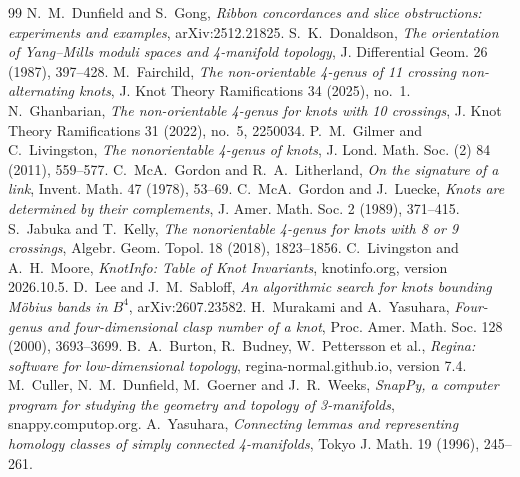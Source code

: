 \documentclass[11pt]{amsart}
\theoremstyle{definition}
\theoremstyle{remark}
\begin{document}
\begin{thebibliography}{99}
 N.~M.~Dunfield and S.~Gong, \emph{Ribbon concordances and slice obstructions:
experiments and examples}, arXiv:2512.21825.
 S.~K.~Donaldson, \emph{The orientation of Yang--Mills moduli spaces and
4-manifold topology}, J. Differential Geom. 26 (1987), 397--428.
 M.~Fairchild, \emph{The non-orientable 4-genus of 11 crossing non-alternating
knots}, J. Knot Theory Ramifications 34 (2025), no.~1.
 N.~Ghanbarian, \emph{The non-orientable 4-genus for knots with 10 crossings},
J. Knot Theory Ramifications 31 (2022), no.~5, 2250034.
 P.~M.~Gilmer and C.~Livingston, \emph{The nonorientable 4-genus of knots},
J. Lond. Math. Soc. (2) 84 (2011), 559--577.
 C.~McA.~Gordon and R.~A.~Litherland, \emph{On the signature of a link},
Invent. Math. 47 (1978), 53--69.
 C.~McA.~Gordon and J.~Luecke, \emph{Knots are determined by their complements},
J. Amer. Math. Soc. 2 (1989), 371--415.
 S.~Jabuka and T.~Kelly, \emph{The nonorientable 4-genus for knots with 8 or 9
crossings}, Algebr. Geom. Topol. 18 (2018), 1823--1856.
 C.~Livingston and A.~H.~Moore, \emph{KnotInfo: Table of Knot Invariants},
knotinfo.org, version 2026.10.5.
 D.~Lee and J.~M.~Sabloff, \emph{An algorithmic search for knots bounding
M\"obius bands in $B^4$}, arXiv:2607.23582.
 H.~Murakami and A.~Yasuhara, \emph{Four-genus and four-dimensional clasp number
of a knot}, Proc. Amer. Math. Soc. 128 (2000), 3693--3699.
 B.~A.~Burton, R.~Budney, W.~Pettersson et al., \emph{Regina: software for
low-dimensional topology}, regina-normal.github.io, version 7.4.
 M.~Culler, N.~M.~Dunfield, M.~Goerner and J.~R.~Weeks, \emph{SnapPy, a
computer program for studying the geometry and topology of 3-manifolds}, snappy.computop.org.
 A.~Yasuhara, \emph{Connecting lemmas and representing homology classes of simply
connected 4-manifolds}, Tokyo J. Math. 19 (1996), 245--261.
\end{thebibliography}
\end{document}
